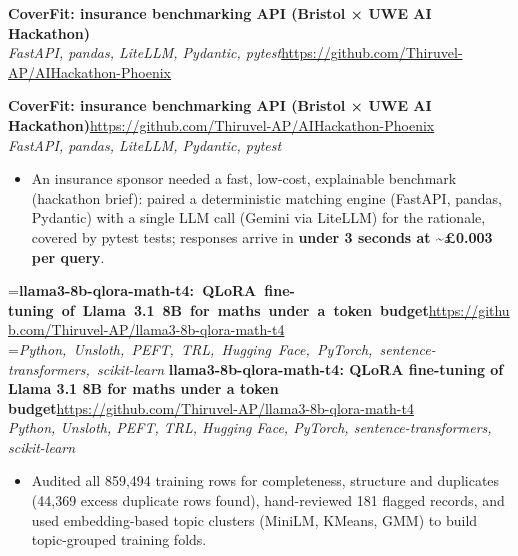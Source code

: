 \documentclass[a4paper,11pt]{article}
\newcommand{\project}[3]{%
  \textbf{#1}\hfill#3\\ {\color{muted}\small\textit{#2}}\par}
\newcommand{\gap}{\vspace{5pt}}
\newcommand{\num}[1]{\textbf{#1}}   %
\begin{document}
\else
\textbf{CoverFit: insurance benchmarking API (Bristol × UWE AI Hackathon)}\\ {\color{muted}\small\textit{FastAPI, pandas, LiteLLM, Pydantic, pytest}}\hfill{\small\url{https://github.com/Thiruvel-AP/AIHackathon-Phoenix}}\par
\fi
\else
\project{CoverFit: insurance benchmarking API (Bristol × UWE AI Hackathon)}{FastAPI, pandas, LiteLLM, Pydantic, pytest}{\url{https://github.com/Thiruvel-AP/AIHackathon-Phoenix}}
\fi
\begin{itemize}
  \item An insurance sponsor needed a fast, low-cost, explainable benchmark (hackathon brief): paired a deterministic matching engine (FastAPI, pandas, Pydantic) with a single LLM call (Gemini via LiteLLM) for the rationale, covered by pytest tests; responses arrive in \num{under 3 seconds at \textasciitilde{}£0.003 per query}.
\end{itemize}
\gap
{}
=\hbox{\textbf{llama3-8b-qlora-math-t4: QLoRA fine-tuning of Llama 3.1 8B for maths under a token budget}\hspace{1em}\url{https://github.com/Thiruvel-AP/llama3-8b-qlora-math-t4}}%
=\hbox{{\small\textit{Python, Unsloth, PEFT, TRL, Hugging Face, PyTorch, sentence-transformers, scikit-learn}}}%
\ifdim\wd0>\linewidth
\ifdim\wd2>\linewidth
\textbf{llama3-8b-qlora-math-t4: QLoRA fine-tuning of Llama 3.1 8B for maths under a token budget}\\ {\color{muted}\small\textit{Python, Unsloth, PEFT, TRL, Hugging Face, PyTorch, sentence-transformers, scikit-learn}}\\ \hspace*{\fill}{\small\url{https://github.com/Thiruvel-AP/llama3-8b-qlora-math-t4}}\par
\else
\textbf{llama3-8b-qlora-math-t4: QLoRA fine-tuning of Llama 3.1 8B for maths under a token budget}\\ {\color{muted}\small\textit{Python, Unsloth, PEFT, TRL, Hugging Face, PyTorch, sentence-transformers, scikit-learn}}\hfill{\small\url{https://github.com/Thiruvel-AP/llama3-8b-qlora-math-t4}}\par
\fi
\else
\project{llama3-8b-qlora-math-t4: QLoRA fine-tuning of Llama 3.1 8B for maths under a token budget}{Python, Unsloth, PEFT, TRL, Hugging Face, PyTorch, sentence-transformers, scikit-learn}{\url{https://github.com/Thiruvel-AP/llama3-8b-qlora-math-t4}}
\fi
\begin{itemize}
  \item Audited all 859,494 training rows for completeness, structure and duplicates (44,369 excess duplicate rows found), hand-reviewed 181 flagged records, and used embedding-based topic clusters (MiniLM, KMeans, GMM) to build topic-grouped training folds.
\end{itemize}
\end{document}
